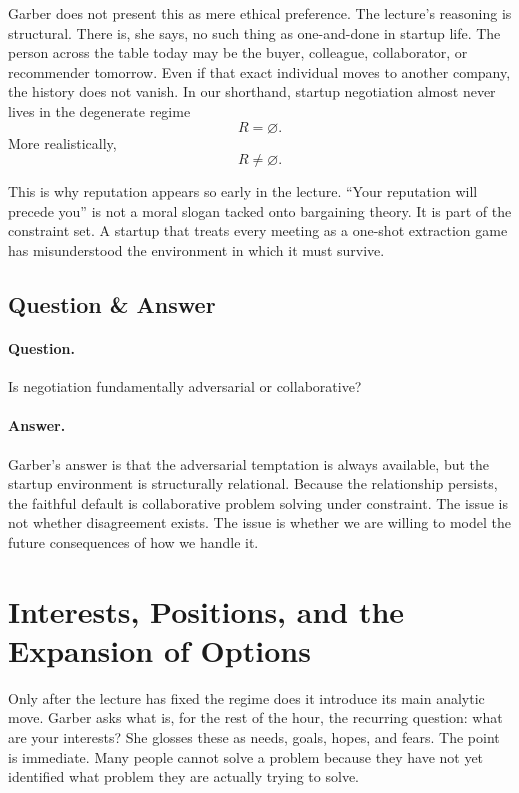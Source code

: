 Garber does not present this as mere ethical preference. The lecture's reasoning is structural. There is, she says, no such thing as one-and-done in startup life. The person across the table today may be the buyer, colleague, collaborator, or recommender tomorrow. Even if that exact individual moves to another company, the history does not vanish. In our shorthand, startup negotiation almost never lives in the degenerate regime
\[
R = \varnothing.
\]
More realistically,
\begin{equation}
R \neq \varnothing.
\end{equation}

This is why reputation appears so early in the lecture. ``Your reputation will precede you'' is not a moral slogan tacked onto bargaining theory. It is part of the constraint set. A startup that treats every meeting as a one-shot extraction game has misunderstood the environment in which it must survive.

\subsection{Question \& Answer}

\paragraph{Question.} Is negotiation fundamentally adversarial or collaborative?

\paragraph{Answer.} Garber's answer is that the adversarial temptation is always available, but the startup environment is structurally relational. Because the relationship persists, the faithful default is collaborative problem solving under constraint. The issue is not whether disagreement exists. The issue is whether we are willing to model the future consequences of how we handle it.

\section{Interests, Positions, and the Expansion of Options}

Only after the lecture has fixed the regime does it introduce its main analytic move. Garber asks what is, for the rest of the hour, the recurring question: what are your interests? She glosses these as needs, goals, hopes, and fears. The point is immediate. Many people cannot solve a problem because they have not yet identified what problem they are actually trying to solve.

